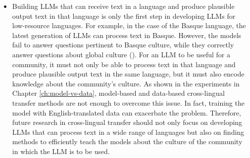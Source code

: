 \begin{itemize}
    \item Building LLMs that can receive text in a language and produce plausible output text in that language is only the first step in developing LLMs for low-resource languages. For example, in the case of the Basque language, the latest generation of LLMs can process text in Basque. However, the models fail to answer questions pertinent to Basque culture, while they correctly answer questions about global culture (\cite{etxaniz2024bertaqalanguagemodelsknow}). For an LLM to be useful for a community, it must not only be able to process text in that language and produce plausible output text in the same language, but it must also encode knowledge about the community's culture. As shown in the experiments in Chapter \ref{ch:model-vs-data}, model-based and data-based cross-lingual transfer methods are not enough to overcome this issue. In fact, training the model with English-translated data can exacerbate the problem. Therefore, future research in cross-lingual transfer should not only focus on developing LLMs that can process text in a wide range of languages but also on finding methods to efficiently teach the models about the culture of the community in which the LLM is to be used.

\end{itemize}